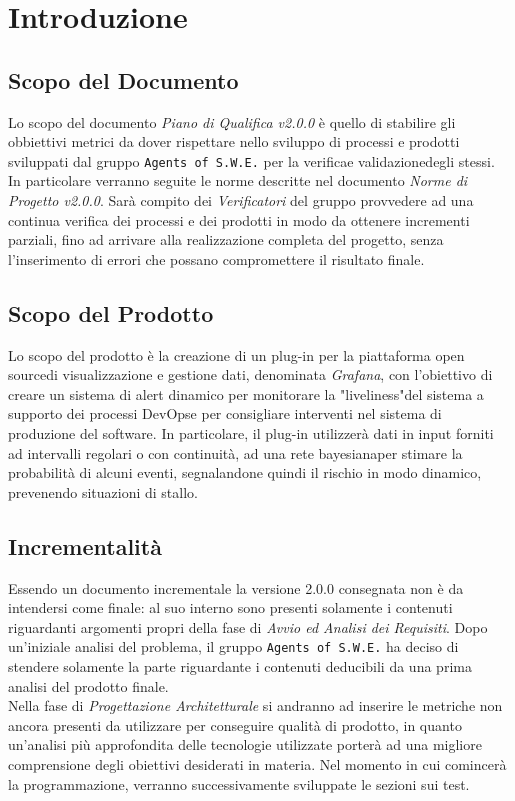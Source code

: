 \section{Introduzione}
\label{introduzione}

\subsection{Scopo del Documento}

Lo scopo del documento \textit{Piano di Qualifica v2.0.0} è quello di stabilire gli obbiettivi metrici da dover rispettare nello sviluppo di processi e prodotti sviluppati dal gruppo \texttt{Agents of S.W.E.} per la verifica\glossario e validazione\glossario degli stessi. In particolare verranno seguite le norme descritte nel documento \textit{Norme di Progetto v2.0.0}. Sarà compito dei \textit{Verificatori} del gruppo provvedere ad una continua verifica dei processi e dei prodotti in modo da ottenere incrementi parziali, fino ad arrivare alla realizzazione completa del progetto, senza l'inserimento di errori che possano compromettere il risultato finale. 

\subsection{Scopo del Prodotto}
Lo scopo del prodotto è la creazione di un plug-in per la piattaforma open source\glossario di visualizzazione e gestione dati, denominata \textit{Grafana}, 
con l'obiettivo di creare un sistema di alert dinamico per monitorare la "liveliness"\glossario del sistema a supporto dei processi
DevOps\glossario e per consigliare interventi nel sistema di produzione del software.
In particolare, il plug-in utilizzerà dati in input forniti ad intervalli regolari o con continuità, ad una rete bayesiana\glossario per stimare la probabilità di alcuni eventi, segnalandone quindi il rischio in modo dinamico, prevenendo situazioni di stallo.   

\subsection{Incrementalità}
Essendo un documento incrementale la versione 2.0.0 consegnata non è da intendersi come finale: al suo interno sono presenti solamente i contenuti riguardanti argomenti propri della fase di \textit{Avvio ed Analisi dei Requisiti}.
Dopo un'iniziale analisi del problema, il gruppo \texttt{Agents of S.W.E.} ha deciso di stendere solamente la parte riguardante i contenuti deducibili da una prima analisi del prodotto finale.\\
Nella fase di \textit{Progettazione Architetturale} si andranno ad inserire le metriche non ancora presenti da utilizzare per conseguire qualità di prodotto, in quanto un'analisi più approfondita delle tecnologie utilizzate porterà ad una migliore comprensione degli obiettivi desiderati in materia.
Nel momento in cui comincerà la programmazione, verranno successivamente sviluppate le sezioni sui test.


